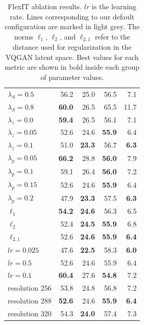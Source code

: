 \begin{table}
\begin{tabular}{lrrrr}
                   $\lambda_S=0.5$ & 56.2 &   25.0 &   56.5 &  7.1 \\
                   $\lambda_S=0.8$ & \textbf{60.0} &   26.5 &   65.5 & 11.7 \\
                   \midrule
                   $\lambda_z=0.0$ & \textbf{59.4} &   26.5 &   56.1 &  7.1 \\
                   \rowcolor{LightGrey} $\lambda_z=0.05$& 52.6 &   24.6 &  \textbf{55.9} &  6.4 \\
                   $\lambda_z=0.1$ & 51.0 &   \textbf{23.3} &   56.7 &  \textbf{6.3} \\
                   \midrule
                   $\lambda_p=0.05$ & \textbf{66.2} &  28.8 &  \textbf{56.0} &  7.9 \\
                   $\lambda_p=0.1$ & 59.1 &   26.4 &   \textbf{56.0} &  7.2 \\
                   \rowcolor{LightGrey} $\lambda_p=0.15$   & 52.6 &   24.6 &  \textbf{55.9} &  6.4 \\
                   $\lambda_p=0.2$ & 47.9 &   \textbf{23.3} &   57.5 & \textbf{6.3} \\
                   \midrule
                    $\ell_1$ & \textbf{54.2} &   \textbf{24.6} &   56.3 &  6.5 \\
                    $\ell_2$ & 52.4 &   \textbf{24.5} &  \textbf{55.9} &  6.8 \\
                    \rowcolor{LightGrey} $\ell_{2,1}$ & 52.6 &   \textbf{24.6} &  \textbf{55.9} &  \textbf{6.4} \\
                    \midrule
                    $lr=0.025$ & 47.6 &   \textbf{22.5} &   58.3 &  \textbf{6.0} \\
                    \rowcolor{LightGrey} $lr=0.5$     & 52.6 &   24.6 &    55.9 &  6.4 \\
                    $lr=0.1$ & \textbf{60.4} &   27.6 &   \textbf{54.8} &  7.2 \\
                    \midrule
                  resolution 256 & 53.8 &   24.8 &   56.8 &  7.2 \\
                  \rowcolor{LightGrey} resolution 288 & \textbf{52.6} &   24.6 &   \textbf{55.9} &  \textbf{6.4} \\
                  resolution 320 & 54.3 &   \textbf{24.0} &   57.4 &  7.3 \\
                  \bottomrule
\end{tabular}

\caption{\label{table:ablations} FlexIT ablation results. $lr$ is the learning rate. Lines corresponding to our default configuration are marked in light grey. The norms $\ell_1$,  $\ell_2$, and $\ell_{2,1}$  refer to the distance used for regularization in the VQGAN latent space. Best values for each metric are shown in bold inside each group of parameter values.
}
\end{table}

